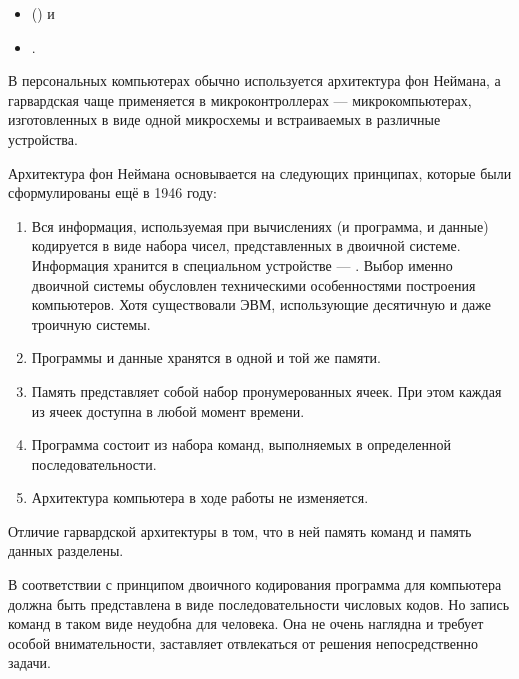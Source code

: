 \begin{itemize}
\item {}
  () и
\item {}.
\end{itemize}

В персональных компьютерах обычно используется архитектура фон
Неймана, а гарвардская чаще применяется в микроконтроллерах —
микрокомпьютерах, изготовленных в виде одной микросхемы и встраиваемых
в различные устройства.


Архитектура фон Неймана основывается на следующих принципах, которые
были сформулированы ещё в 1946 году:

\begin{enumerate}
\item {} Вся информация, используемая при вычислениях (и
  программа, и данные) кодируется в виде набора чисел, представленных
  в двоичной системе. Информация хранится в специальном устройстве —
  . Выбор именно двоичной системы обусловлен
  техническими особенностями построения компьютеров. Хотя существовали
  ЭВМ, использующие десятичную и даже троичную системы.
\item {}
  Программы и данные хранятся в одной и той же памяти.
\item {}
  Память представляет собой набор пронумерованных ячеек. При этом
  каждая из ячеек доступна в любой момент времени.
\item {} Программа состоит из набора команд, выполняемых в
  определенной последовательности.
\item {} Архитектура компьютера в ходе работы не изменяется.
\end{enumerate}

Отличие гарвардской архитектуры в том, что в ней память команд и
память данных разделены.


В соответствии с принципом двоичного кодирования программа для
компьютера должна быть представлена в виде последовательности числовых
кодов. Но запись команд в таком виде неудобна для человека. Она не
очень наглядна и требует особой внимательности, заставляет отвлекаться
от решения непосредственно задачи.

